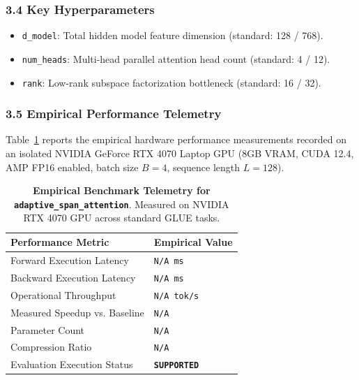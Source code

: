 \subsubsection*{3.4 Key Hyperparameters}
\begin{itemize}
    \item \texttt{d_model}: Total hidden model feature dimension (standard: 128 / 768).
    \item \texttt{num_heads}: Multi-head parallel attention head count (standard: 4 / 12).
    \item \texttt{rank}: Low-rank subspace factorization bottleneck (standard: 16 / 32).
\end{itemize}

\subsubsection*{3.5 Empirical Performance Telemetry}
Table~\ref{tab:telemetry_adaptive\_span\_attention} reports the empirical hardware performance measurements recorded on an isolated NVIDIA GeForce RTX 4070 Laptop GPU (8GB VRAM, CUDA 12.4, AMP FP16 enabled, batch size $B=4$, sequence length $L=128$).

\begin{table}[h]
\centering
\small
\caption{\textbf{Empirical Benchmark Telemetry for \texttt{adaptive\_span\_attention}}. Measured on NVIDIA RTX 4070 GPU across standard GLUE tasks.}
\label{tab:telemetry_adaptive\_span\_attention}
\begin{tabularx}{\columnwidth}{lX}
\toprule
\textbf{Performance Metric} & \textbf{Empirical Value} \\
\midrule
Forward Execution Latency & \texttt{N/A ms} \\
Backward Execution Latency & \texttt{N/A ms} \\
Operational Throughput & \texttt{N/A tok/s} \\
Measured Speedup vs. Baseline & \texttt{N/A} \\
Parameter Count & \texttt{N/A} \\
Compression Ratio & \texttt{N/A} \\
Evaluation Execution Status & \textbf{\texttt{SUPPORTED}} \\
\bottomrule
\end{tabularx}
\end{table}

